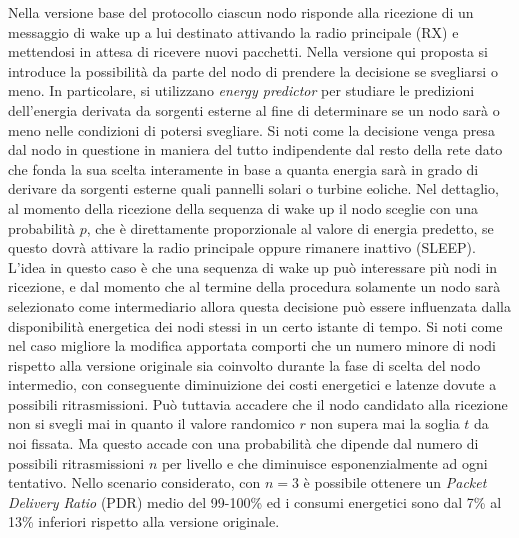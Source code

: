 \documentclass[binding=0.6cm,TFA]{sapthesis}
\begin{document}
Nella versione base del protocollo ciascun nodo risponde alla ricezione di un messaggio di wake up a lui destinato attivando la radio principale (RX) e mettendosi
in attesa di ricevere nuovi pacchetti. Nella versione qui proposta si introduce la possibilità da parte del nodo di prendere la decisione se svegliarsi o meno.
In particolare, si utilizzano \emph{energy predictor} per studiare le predizioni dell'energia derivata da sorgenti esterne al fine di determinare se un nodo sarà o
meno nelle condizioni di potersi svegliare. Si noti come la decisione venga presa dal nodo in questione in maniera del tutto indipendente dal resto della rete dato
che fonda la sua scelta interamente in base a quanta energia sarà in grado di derivare da sorgenti esterne quali pannelli solari o turbine eoliche. Nel dettaglio,
al momento della ricezione della sequenza di wake up il nodo sceglie con una probabilità $p$, che è direttamente proporzionale al valore di energia predetto,
se questo dovrà attivare la radio principale oppure rimanere inattivo (SLEEP). L'idea in questo caso è che una sequenza di wake up può interessare più nodi
in ricezione, e dal momento che al termine della procedura solamente un nodo sarà selezionato come intermediario allora questa decisione può essere influenzata dalla
disponibilità energetica dei nodi stessi in un certo istante di tempo. Si noti come nel caso migliore la modifica apportata comporti che un numero minore di nodi
rispetto alla versione originale sia coinvolto durante la fase di scelta del nodo intermedio, con conseguente diminuizione dei costi energetici e latenze dovute a
possibili ritrasmissioni. Può tuttavia accadere che il nodo candidato alla ricezione non si svegli mai in quanto il valore randomico $r$ non supera mai la
soglia $t$ da noi fissata. Ma questo accade con una probabilità che dipende dal numero di possibili ritrasmissioni $n$ per livello e che diminuisce esponenzialmente
ad ogni tentativo. Nello scenario considerato, con $n=3$ è possibile ottenere un \emph{Packet Delivery Ratio} (PDR) medio del 99-100\% ed i consumi
energetici sono dal 7\% al 13\% inferiori rispetto alla versione originale.\\
\end{document}
